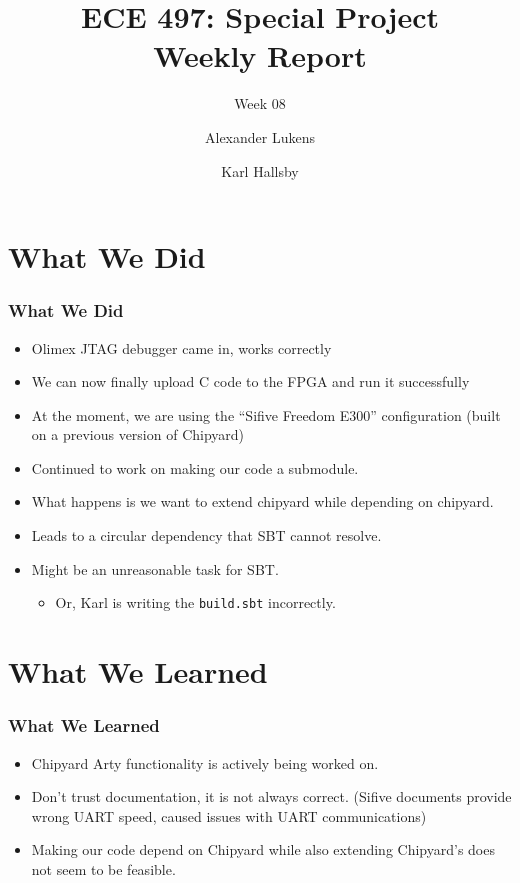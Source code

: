 \documentclass{../weeklyslides}
\title[Weekly Report]{ECE 497: Special Project \\ Weekly Report}
\subtitle{Week 08}
\author{Alexander Lukens \and Karl Hallsby}
\institute{Illinois Institute of Technology}
\date{\DTMdisplaydate{2021}{3}{18}{-1}}
\begin{document}
\nocite{chipyard}

\begin{frame}
  \titlepage{}
\end{frame}

\section{What We Did}
\begin{frame}
  \frametitle{What We Did}
  \begin{itemize}
  \item Olimex JTAG debugger came in, works correctly
  \item We can now finally upload C code to the FPGA and run it successfully
  \item At the moment, we are using the ``Sifive Freedom E300'' configuration (built on a previous version of Chipyard)
  \end{itemize}
  \begin{itemize}
  \item Continued to work on making our code a submodule.
  \item What happens is we want to extend chipyard while depending on chipyard.
  \item Leads to a circular dependency that SBT cannot resolve.
  \item Might be an unreasonable task for SBT.\@
    \begin{itemize}
    \item Or, Karl is writing the \texttt{build.sbt} incorrectly.
    \end{itemize}
  \end{itemize}
\end{frame}

\section{What We Learned}\label{sec:What_We_Learned}
\begin{frame}
  \frametitle{What We Learned}
  \begin{itemize}
  \item Chipyard Arty functionality is actively being worked on.
  \item Don't trust documentation, it is not always correct. (Sifive documents provide wrong UART speed, caused issues with UART communications)
  \item Making our code depend on Chipyard while also extending Chipyard's does not seem to be feasible.
  \end{itemize}
\end{frame}
\end{document}
